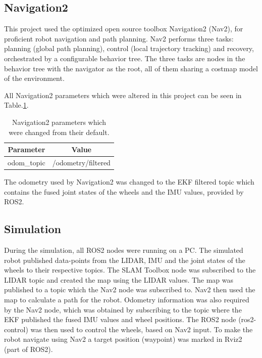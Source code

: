 
\subsection{Navigation2}

This project used the optimized open source toolbox Navigation2 (Nav2), for proficient robot navigation and path planning\:\cite{macenski_desks_2023}\cite{macenski_open-source_2024}\cite{macenski_regulated_2023}\cite{merzlyakov_comparison_2021}\cite{macenski_marathon_2020}.
Nav2 performs three tasks: planning (global path planning), control (local trajectory tracking) and recovery, orchestrated by a configurable behavior tree\:\cite{macenski_marathon_2020}. The three tasks are nodes in the behavior tree with the navigator as the root, all of them sharing a costmap model of the environment\:\cite{macenski_marathon_2020}.



All Navigation2 parameters which were altered in this project can be seen in Table.\:\ref{tab:nav2_params_changed}.
\begin{table}
    \centering
    \begin{tabular}{|c|c|} \hline
         \textbf{Parameter}         & \textbf{Value}        \\ \hline
         odom\_topic                & /odometry/filtered    \\ \hline
    \end{tabular}
    \caption{Navigation2 parameters which were changed from their default.}
    \label{tab:nav2_params_changed}
\end{table}
The odometry used by Navigation2 was changed to the EKF filtered topic which contains the fused joint states of the wheels and the IMU values, provided by ROS2.


\subsection{Simulation}
\label{subsection:simulation}

During the simulation, all ROS2 nodes were running on a PC. The simulated robot published data-points from the LIDAR, IMU and the joint states of the wheels to their respective topics. The SLAM Toolbox node was subscribed to the LIDAR topic and created the map using the LIDAR values. The map was published to a topic which the Nav2 node was subscribed to. Nav2 then used the map to calculate a path for the robot. Odometry information was also required by the Nav2 node, which was obtained by subscribing to the topic where the EKF published the fused IMU values and wheel positions. The ROS2 node (ros2-control) was then used to control the wheels, based on Nav2 input. To make the robot navigate using Nav2 a target position (waypoint) was marked in Rviz2 (part of ROS2). 

